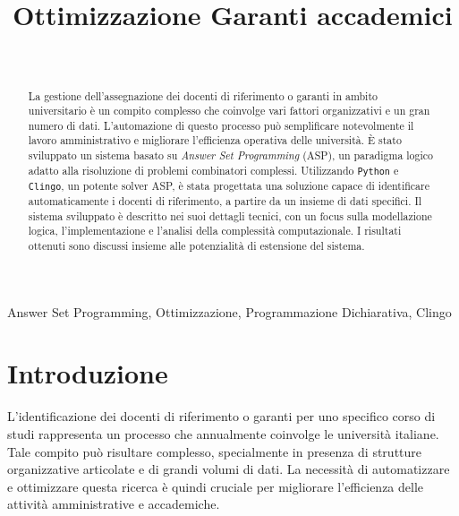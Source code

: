 \documentclass[journal]{IEEEtran}
\begin{document}
\title{Ottimizzazione Garanti accademici}

\author{
\\

}

\maketitle

\begin{abstract} 
	La gestione dell'assegnazione dei docenti di riferimento o
	garanti in ambito universitario è un compito complesso che coinvolge vari
	fattori organizzativi e un gran numero di dati. L'automazione di questo
	processo può semplificare notevolmente il lavoro amministrativo e migliorare
	l'efficienza operativa delle università. È stato sviluppato un sistema basato
	su \textit{Answer Set Programming} (ASP), un paradigma logico adatto alla
	risoluzione di problemi combinatori complessi. Utilizzando \texttt{Python} e
	\texttt{Clingo}, un potente solver ASP,  è stata progettata una soluzione
	capace di identificare automaticamente i docenti di riferimento, a partire da
	un insieme di dati specifici. Il sistema sviluppato è descritto nei suoi
	dettagli tecnici, con un focus sulla modellazione logica, l'implementazione e
	l'analisi della complessità computazionale. I risultati ottenuti sono discussi
	insieme alle potenzialità di estensione del sistema.
\end{abstract}

\begin{IEEEkeywords}
Answer Set Programming, Ottimizzazione, Programmazione Dichiarativa, Clingo
\end{IEEEkeywords}

\section{Introduzione} L'identificazione dei docenti di riferimento o garanti
per uno specifico corso di studi rappresenta un processo che annualmente
coinvolge le università italiane. Tale compito può risultare complesso,
specialmente in presenza di strutture organizzative articolate e di grandi
volumi di dati. La necessità di automatizzare e ottimizzare questa ricerca è
quindi cruciale per migliorare l'efficienza delle attività amministrative e
accademiche.
\end{document}
